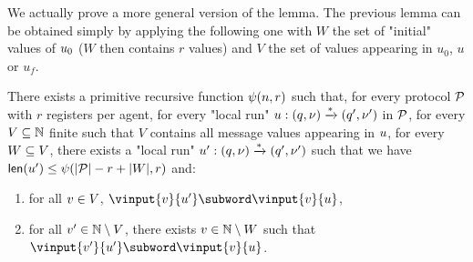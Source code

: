 


We actually prove a more general version of the lemma. The previous lemma can be obtained simply by applying the following one with $W$ the set of "initial" values of $u_0$ ($W$ then contains $r$ values) and $V$ the set of values appearing in $u_0$, $u$ or $u_f$.

\begin{lemma}
	There exists a primitive recursive function $\psi(n,r)$ such that, for every protocol $\mathcal{P}$ with $r$ registers per agent, for every "local run" $u: (q, \nu) \xrightarrow{*} (q', \nu')$ in $\mathcal{P}$, for every $V \subseteq \mathbb{N}$ finite such that $V$ contains all message values appearing in $u$,  for every $W \subseteq V$, there exists a "local run" $u': (q, \nu) \xrightarrow{*} (q', \nu')$ such that we have $\mathsf{len}(u') \leq \psi(|\mathcal{P}| -r + |W|,r)$ and:
	\begin{enumerate}
		\item \label{item:shorterrun_oldvalues} for all $v \in V$, $\vinput{\aval}{\localrun'} \subword \vinput{\aval}{\localrun}$,
		
		\item \label{item:shorterrun_anyvalue} for all $v' \in \mathbb{N} \setminus V$, there exists $v \in \mathbb{N} \setminus W$ such that $\vinput{\aval'}{\localrun'} \subword \vinput{\aval}{\localrun}$.
	\end{enumerate}
\end{lemma}

